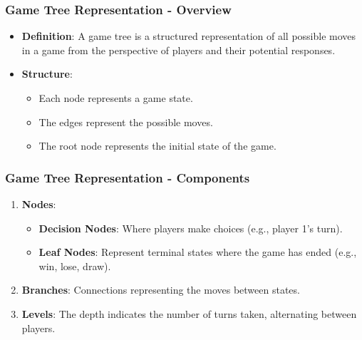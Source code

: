 \documentclass[aspectratio=169]{beamer}
\begin{document}
\begin{frame}[fragile]
  \frametitle{Game Tree Representation - Overview}
  \begin{itemize}
    \item \textbf{Definition}: A game tree is a structured representation of all possible moves in a game from the perspective of players and their potential responses.
    \item \textbf{Structure}: 
    \begin{itemize}
      \item Each node represents a game state.
      \item The edges represent the possible moves.
      \item The root node represents the initial state of the game.
    \end{itemize}
  \end{itemize}
\end{frame}

\begin{frame}[fragile]
  \frametitle{Game Tree Representation - Components}
  \begin{enumerate}
    \item \textbf{Nodes}: 
      \begin{itemize}
        \item \textbf{Decision Nodes}: Where players make choices (e.g., player 1's turn).
        \item \textbf{Leaf Nodes}: Represent terminal states where the game has ended (e.g., win, lose, draw).
      \end{itemize}
    
    \item \textbf{Branches}: Connections representing the moves between states.

    \item \textbf{Levels}: The depth indicates the number of turns taken, alternating between players.
  \end{enumerate}
\end{frame}
\end{document}
